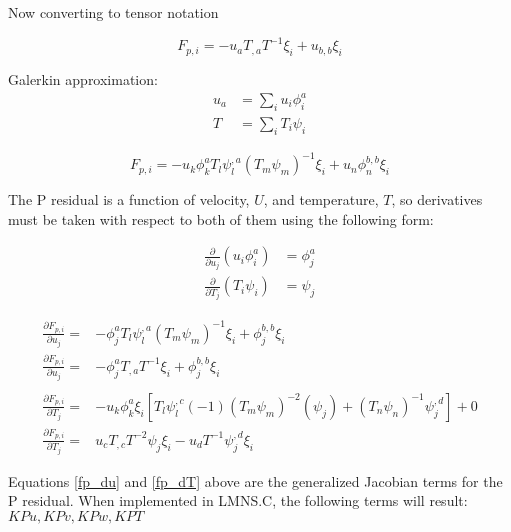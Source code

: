 Now converting to tensor notation

\begin{equation}
    F_{p,i} = -u_a T_{,a} T^{-1} \xi_i + u_{b,b}\xi_i
\end{equation}

Galerkin approximation:
\begin{align*}
    u_a &= \sum_i u_i \phi_i^a\\
    T &= \sum_i T_i \psi_i
\end{align*}

\begin{equation}
    F_{p,i} = -u_k \phi_k^a T_l \psi_l^{,a} (T_m \psi_m)^{-1} \xi_i + u_n \phi_n^{b,b} \xi_i
\end{equation}

The P residual is a function of velocity, $U$, and temperature, $T$, so derivatives must be taken with respect to both of them using the following form:

\begin{align*}
    \frac{\partial}{\partial u_j} (u_i \phi_i^a) &= \phi_j^a \\
    \frac{\partial}{\partial T_j} (T_i \psi_i) &= \psi_j
\end{align*}

\begin{align}
    \frac{\partial F_{p,i}}{\partial u_j} = &-\phi_j^{a} T_l \psi_l^{,a} (T_m \psi_m)^{-1} \xi_i + \phi_j^{b,b} \xi_i \nonumber \\
    \frac{\partial F_{p,i}}{\partial u_j} = &-\phi_j^{a} T_{,a} T^{-1} \xi_i + \phi_j^{b,b} \xi_i \label {fp_du}\\ 
    \nonumber \\
    \frac{\partial F_{p,i}}{\partial T_j} = &-u_k \phi_k^a \xi_i \left [ T_l
\psi_l^{,c} (-1) (T_m \psi_m)^{-2} (\psi_j) + (T_n \psi_n)^{-1} \psi_j^{,d} \right ] + 0 \nonumber \\
    \frac{\partial F_{p,i}}{\partial T_j} = &u_c T_{,c} T^{-2} \psi_j \xi_i - u_d T^{-1} \psi_j^{,d} \xi_i \label{fp_dT}
\end{align}

Equations \ref{fp_du} and \ref{fp_dT} above are the generalized Jacobian terms for the P residual. When implemented in LMNS.C, the following terms will result:\\
$KPu, KPv, KPw, KPT$

\newpage
